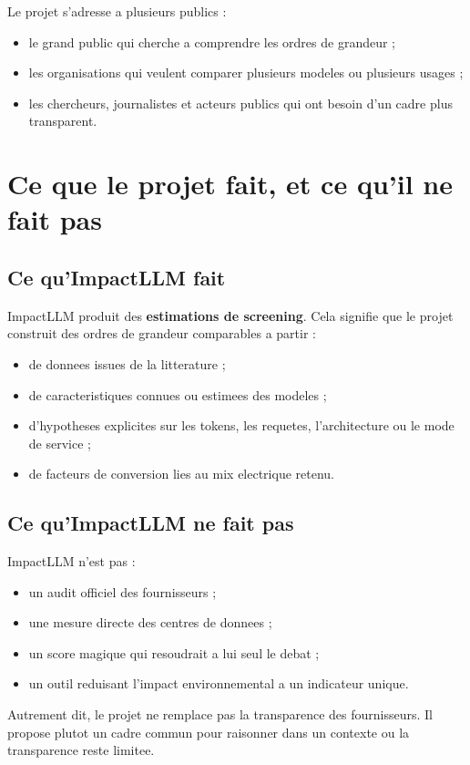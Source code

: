 \documentclass[11pt,a4paper]{article}
\begin{document}
Le projet s'adresse a plusieurs publics :
\begin{itemize}
  \item le grand public qui cherche a comprendre les ordres de grandeur ;
  \item les organisations qui veulent comparer plusieurs modeles ou plusieurs usages ;
  \item les chercheurs, journalistes et acteurs publics qui ont besoin d'un cadre plus transparent.
\end{itemize}

\section{Ce que le projet fait, et ce qu'il ne fait pas}

\subsection{Ce qu'ImpactLLM fait}
ImpactLLM produit des \textbf{estimations de screening}. Cela signifie que le projet construit des ordres de grandeur comparables a partir :
\begin{itemize}
  \item de donnees issues de la litterature ;
  \item de caracteristiques connues ou estimees des modeles ;
  \item d'hypotheses explicites sur les tokens, les requetes, l'architecture ou le mode de service ;
  \item de facteurs de conversion lies au mix electrique retenu.
\end{itemize}

\subsection{Ce qu'ImpactLLM ne fait pas}
ImpactLLM n'est pas :
\begin{itemize}
  \item un audit officiel des fournisseurs ;
  \item une mesure directe des centres de donnees ;
  \item un score magique qui resoudrait a lui seul le debat ;
  \item un outil reduisant l'impact environnemental a un indicateur unique.
\end{itemize}

Autrement dit, le projet ne remplace pas la transparence des fournisseurs. Il propose plutot un cadre commun pour raisonner dans un contexte ou la transparence reste limitee.
\end{document}
